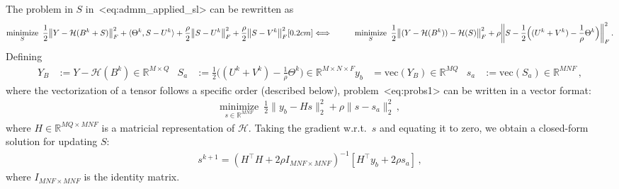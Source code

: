 \documentclass[a4paper,11pt]{article}
\def\\{}%
\def\eqref#1{<#1>}%
\newcommand{\mypar}[1]{\bigskip\noindent {\bf #1.}}
\begin{document}
\mypar{Updating $\bm{S}$}
The problem in $S$ in~\eqref{eq:admm_applied_sl} can be rewritten as
\begin{align}
  &
  \underset{S}{\text{minimize}}\,\,\,
  \frac{1}{2}
  \big\|Y - \mathcal{H}(B^k + S)\big\|_F^2
  +
  \langle\Theta^k, S - U^k\rangle
  +
  \frac{\rho}{2}
  \big\|S - U^k\big\|_{F}^2
  +
  \frac{\rho}{2}
  \big\|S - V^k\big\|_{F}^2
  \notag
  \\[0.2cm]
  \Longleftrightarrow\qquad &
  \underset{S}{\text{minimize}}\,\,\,
  \frac{1}{2}
  \big\|(Y - \mathcal{H}(B^k)) - \mathcal{H}(S)\big\|_F^2
  +
  \rho
  \bigg\|
  S - \frac{1}{2}\Big((U^k + V^k) - \frac{1}{\rho}\Theta^k\Big)
  \bigg\|_F^2\,.
  \label{eq:probs1}
\end{align}
Defining
\begin{align*}
  Y_B &:= Y - \mathcal{H}(B^k) \in \mathbb{R}^{M\times Q}
      &
  S_a &:= \frac{1}{2}\Big((U^k + V^k) - \frac{1}{\rho}\Theta^k\Big) \in
  \mathbb{R}^{M \times N \times F}
  \\
  y_b &= \text{vec}(Y_B) \in \mathbb{R}^{MQ}
    &
  s_a &:= \text{vec}(S_a) \in \mathbb{R}^{MNF}\,,
\end{align*}
where the vectorization of a tensor follows a specific order (described below),
problem~\eqref{eq:probs1} can be written in a vector format:
\begin{align*}
  \underset{s \in \mathbb{R}^{MNF}}{\text{minimize}}\,\,\,
  \frac{1}{2}
  \|y_b - Hs\|_2^2
  +
  \rho
  \| s - s_a\|_2^2\,,
\end{align*}
where $H \in \mathbb{R}^{MQ \times MNF}$ is a matricial representation of
$\mathcal{H}$. Taking the gradient w.r.t.\ $s$ and equating it to zero, we
obtain a closed-form solution for updating $S$:
\begin{align}
  s^{k+1}
  =
  \left(H^\top H + 2\rho I_{MNF \times MNF}\right)^{-1}
  \left[H^\top y_b + 2\rho s_a\right]\,,
  \label{eq:probsclosedformvec}
\end{align}
where $I_{MNF \times MNF}$ is the identity matrix. 
\end{document}
